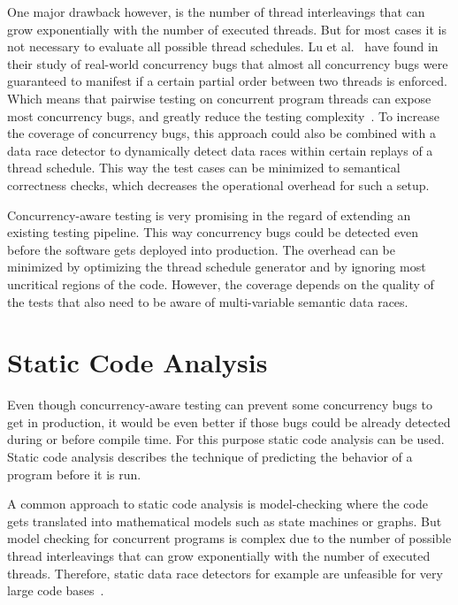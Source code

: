 \documentclass[conference]{IEEEtran}
\begin{document}
One major drawback however, is the number of thread interleavings that can grow exponentially with the number of executed threads.
But for most cases it is not necessary to evaluate all possible thread schedules.
Lu et al.~\cite{lu2008mistakes} have found in their study of real-world concurrency bugs that almost all concurrency bugs were guaranteed to manifest if a certain partial order between two threads is enforced.
Which means that pairwise testing on concurrent program threads can expose most concurrency bugs, and greatly reduce the testing complexity~\cite{lu2008mistakes}.
To increase the coverage of concurrency bugs, this approach could also be combined with a data race detector to dynamically detect data races within certain replays of a thread schedule.
This way the test cases can be minimized to semantical correctness checks, which decreases the operational overhead for such a setup.

Concurrency-aware testing is very promising in the regard of extending an existing testing pipeline.
This way concurrency bugs could be detected even before the software gets deployed into production.
The overhead can be minimized by optimizing the thread schedule generator and by ignoring most uncritical regions of the code.
However, the coverage depends on the quality of the tests that also need to be aware of multi-variable semantic data races.


\section{Static Code Analysis}
\label{sct:static}

Even though concurrency-aware testing can prevent some concurrency bugs to get in production, it would be even better if those bugs could be already detected during or before compile time.
For this purpose static code analysis can be used.
Static code analysis describes the technique of predicting the behavior of a program before it is run.

A common approach to static code analysis is model-checking where the code gets translated into mathematical models such as state machines or graphs.
But model checking for concurrent programs is complex due to the number of possible thread interleavings that can grow exponentially with the number of executed threads.
Therefore, static data race detectors for example are unfeasible for very large code bases~\cite{serebry2009threadsanitizer}.
\end{document}
